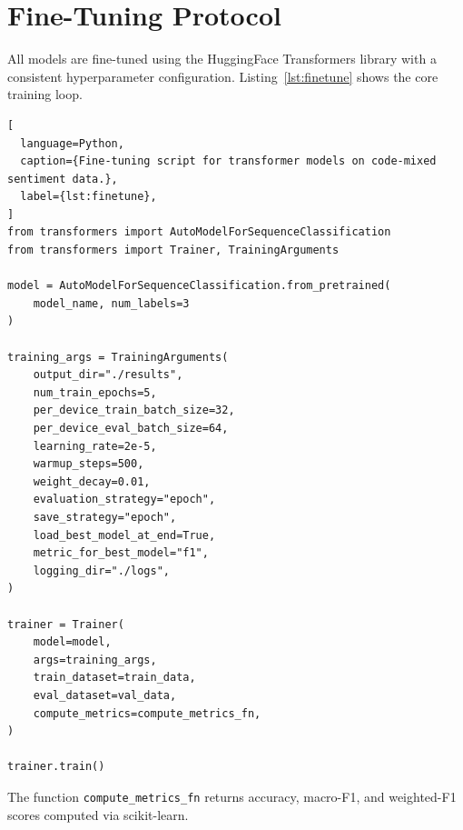 \section{Fine-Tuning Protocol}

All models are fine-tuned using the HuggingFace Transformers library with a consistent hyperparameter configuration. Listing~\ref{lst:finetune} shows the core training loop.

\begin{lstlisting}[
  language=Python,
  caption={Fine-tuning script for transformer models on code-mixed sentiment data.},
  label={lst:finetune},
]
from transformers import AutoModelForSequenceClassification
from transformers import Trainer, TrainingArguments

model = AutoModelForSequenceClassification.from_pretrained(
    model_name, num_labels=3
)

training_args = TrainingArguments(
    output_dir="./results",
    num_train_epochs=5,
    per_device_train_batch_size=32,
    per_device_eval_batch_size=64,
    learning_rate=2e-5,
    warmup_steps=500,
    weight_decay=0.01,
    evaluation_strategy="epoch",
    save_strategy="epoch",
    load_best_model_at_end=True,
    metric_for_best_model="f1",
    logging_dir="./logs",
)

trainer = Trainer(
    model=model,
    args=training_args,
    train_dataset=train_data,
    eval_dataset=val_data,
    compute_metrics=compute_metrics_fn,
)

trainer.train()
\end{lstlisting}

The function \texttt{compute\_metrics\_fn} returns accuracy, macro-F1, and weighted-F1 scores computed via scikit-learn.
